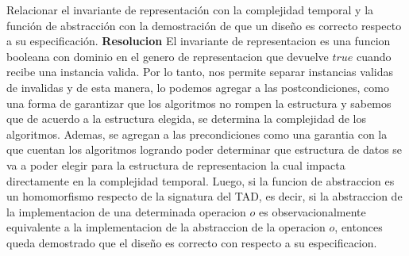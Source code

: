 \documentclass[10pt,a4paper]{article}
\begin{document}
Relacionar el invariante de representación con la complejidad temporal y la función de abstracción con la demostración de que un diseño es correcto respecto a su especificación.
\newline
\newline
\textbf{Resolucion}
\newline
\newline
El invariante de representacion es una funcion booleana con dominio en el genero de representacion que devuelve $true$ cuando recibe una instancia valida. Por lo tanto, nos permite separar instancias validas de invalidas y de esta manera, lo podemos agregar a las postcondiciones, como una forma de garantizar que los algoritmos no rompen la estructura y sabemos que de acuerdo a la estructura elegida, se determina la complejidad de los algoritmos. Ademas, se agregan a las precondiciones como una garantia con la que cuentan los algoritmos logrando poder determinar que estructura de datos se va a poder elegir para la estructura de representacion la cual impacta directamente en la complejidad temporal.   
\newline
\newline
Luego, si la funcion de abstraccion es un homomorfismo respecto de la signatura del TAD, es decir, si la abstraccion de la implementacion de una determinada operacion $o$ es observacionalmente equivalente a la implementacion de la abstraccion de la operacion $o$, entonces queda demostrado que el diseño es correcto con respecto a su especificacion. 
\newpage
\end{document}
